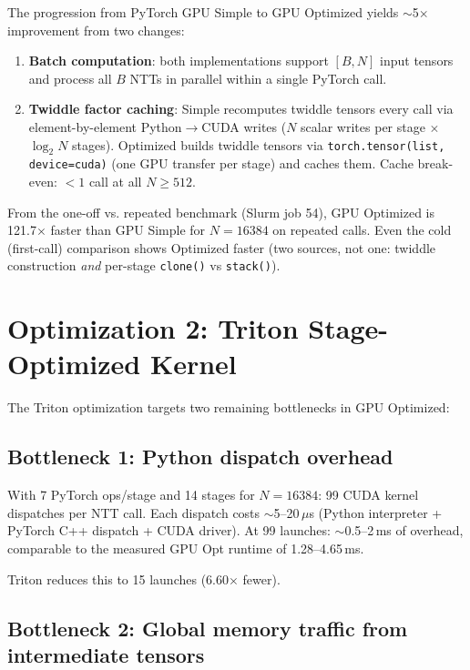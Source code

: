 \documentclass[11pt,a4paper]{article}
\begin{document}
The progression from PyTorch GPU Simple to GPU Optimized yields $\sim$5$\times$ improvement
from two changes:

\begin{enumerate}
  \item \textbf{Batch computation}: both implementations support $[B, N]$ input tensors
    and process all $B$ NTTs in parallel within a single PyTorch call.
  \item \textbf{Twiddle factor caching}: Simple recomputes twiddle tensors every call
    via element-by-element Python$\to$CUDA writes ($N$ scalar writes per stage $\times$
    $\log_2 N$ stages). Optimized builds twiddle tensors via \texttt{torch.tensor(list,
    device=cuda)} (one GPU transfer per stage) and caches them. Cache break-even: $<1$
    call at all $N \geq 512$.
\end{enumerate}

From the one-off vs. repeated benchmark (Slurm job 54), GPU Optimized is 121.7$\times$
faster than GPU Simple for $N=16384$ on repeated calls. Even the cold (first-call)
comparison shows Optimized faster (two sources, not one: twiddle construction \emph{and}
per-stage \texttt{clone()} vs \texttt{stack()}).

\section{Optimization 2: Triton Stage-Optimized Kernel}

The Triton optimization targets two remaining bottlenecks in GPU Optimized:

\subsection{Bottleneck 1: Python dispatch overhead}

With 7 PyTorch ops/stage and 14 stages for $N=16384$: 99 CUDA kernel dispatches per NTT
call. Each dispatch costs $\sim$5--20\,$\mu$s (Python interpreter + PyTorch C++ dispatch +
CUDA driver). At 99 launches: $\sim$0.5--2\,ms of overhead, comparable to the measured
GPU Opt runtime of 1.28--4.65\,ms.

Triton reduces this to 15 launches (6.60$\times$ fewer).

\subsection{Bottleneck 2: Global memory traffic from intermediate tensors}
\end{document}
